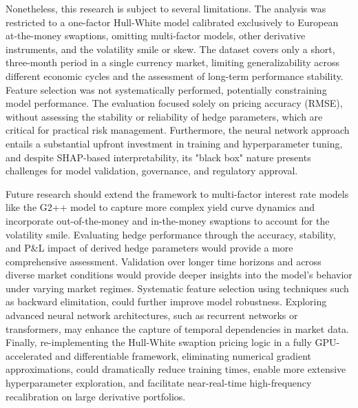Nonetheless, this research is subject to several limitations. The analysis was restricted to a one-factor Hull-White model calibrated exclusively to European at-the-money swaptions, omitting multi-factor models, other derivative instruments, and the volatility smile or skew. The dataset covers only a short, three-month period in a single currency market, limiting generalizability across different economic cycles and the assessment of long-term performance stability. Feature selection was not systematically performed, potentially constraining model performance. The evaluation focused solely on pricing accuracy (RMSE), without assessing the stability or reliability of hedge parameters, which are critical for practical risk management. Furthermore, the neural network approach entails a substantial upfront investment in training and hyperparameter tuning, and despite SHAP-based interpretability, its "black box" nature presents challenges for model validation, governance, and regulatory approval.  

Future research should extend the framework to multi-factor interest rate models like the G2++ model to capture more complex yield curve dynamics and incorporate out-of-the-money and in-the-money swaptions to account for the volatility smile. Evaluating hedge performance through the accuracy, stability, and P\&L impact of derived hedge parameters would provide a more comprehensive assessment. Validation over longer time horizons and across diverse market conditions would provide deeper insights into the model's behavior under varying market regimes. Systematic feature selection using techniques such as backward elimitation, could further improve model robustness. Exploring advanced neural network architectures, such as recurrent networks or transformers, may enhance the capture of temporal dependencies in market data. Finally, re-implementing the Hull-White swaption pricing logic in a fully GPU-accelerated and differentiable framework, eliminating numerical gradient approximations, could dramatically reduce training times, enable more extensive hyperparameter exploration, and facilitate near-real-time high-frequency recalibration on large derivative portfolios.
